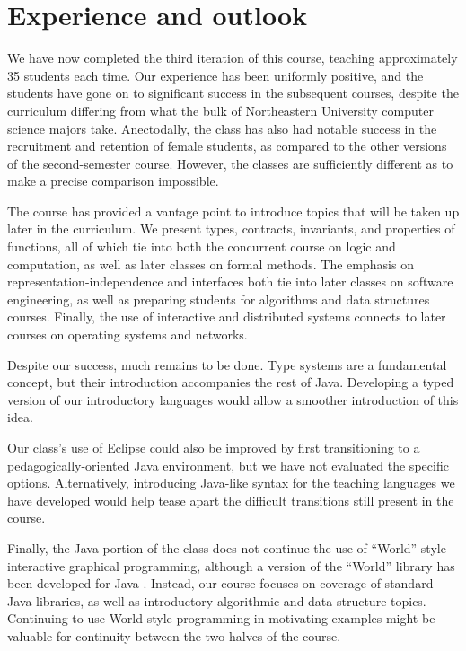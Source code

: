 \documentclass[submission,copyright]{eptcs}
\begin{document}
\section{Experience and outlook}
\label{sec:conclusion}

We have now completed the third iteration of this course, teaching
approximately 35 students each time.  Our experience has been
uniformly positive, and the students have gone on to significant
success in the subsequent courses, despite the curriculum differing
from what the bulk of Northeastern University computer science majors
take.  Anectodally, the class has also had notable success in the
recruitment and retention of female students, as compared to the other
versions of the second-semester course. However, the classes are
sufficiently different as to make a precise comparison impossible.

The course has provided a vantage point to introduce topics that will
be taken up later in the curriculum.  We present types, contracts,
invariants, and properties of functions, all of which tie into both
the concurrent course on logic and computation, as well as later
classes on formal methods.  The emphasis on
representation-independence and interfaces both tie into later classes
on software engineering, as well as preparing students for algorithms
and data structures courses.  Finally, the use of interactive and
distributed systems connects to later courses on operating systems and
networks.

Despite our success, much remains to be done.  Type systems are a
fundamental concept, but their introduction accompanies the rest of
Java.  Developing a typed version of our introductory languages would
allow a smoother introduction of this idea.  

Our class's use of Eclipse could also be improved by first
transitioning to a pedagogically-oriented Java environment, but we
have not evaluated the specific options.  Alternatively, introducing
Java-like syntax for the teaching languages we have developed would
help tease apart the difficult transitions still present in the course.

Finally, the Java portion of the class does not continue the use of
``World''-style interactive graphical programming, although a version
of the ``World'' library has been developed for Java
\cite{local:java-world}.  Instead, our course focuses on coverage of
standard Java libraries, as well as introductory algorithmic and data
structure topics.  Continuing to use World-style programming in
motivating examples might be valuable for continuity between the two
halves of the course.
\end{document}
